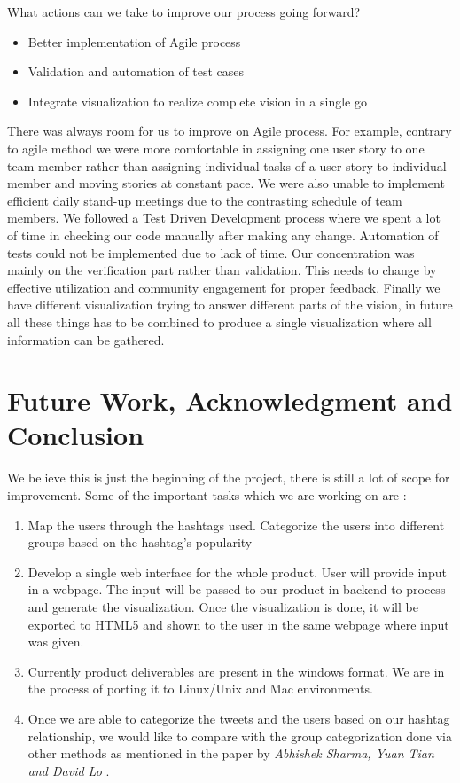 \documentclass[11pt]{article}
\begin{document}
What actions can we take to improve our process going forward? 
\begin{itemize}
\item Better implementation of Agile process 
\item Validation and automation of test cases
\item Integrate visualization to realize complete vision in a single go
\end{itemize}

There was always room for us to improve on Agile process. For example, contrary to agile method we were more comfortable in assigning one user story to one team member rather than assigning individual tasks of a user story to individual member and moving stories at constant pace. We were also unable to implement efficient daily stand-up meetings due to the contrasting schedule of team members. We followed a Test Driven Development process where we spent a lot of time in checking our code manually after making any change. Automation of tests could not be implemented due to lack of time. Our concentration was mainly on the verification part rather than validation. This needs to change by effective utilization and community engagement for proper feedback. Finally we have different visualization trying to answer different parts of the vision, in future all these things has to be combined to produce a single visualization where all information can be gathered. 

\section{Future Work, Acknowledgment and Conclusion}

We believe this is just the beginning of the project, there is still a lot of scope for improvement. Some of the important tasks which we are working on are :
\begin{enumerate}
\item Map the users through the hashtags used. Categorize the users into different groups based on the hashtag's popularity
\item Develop a single web interface for the whole product. User will provide input in a webpage. The input will be passed to our product in backend to process and generate the visualization. Once the visualization is done, it will be exported to HTML5 and shown to the user in the same webpage where input was given.
\item Currently product deliverables are present in the windows format. We are in the process of porting it to Linux/Unix and Mac environments.
\item Once we are able to categorize the tweets and the users based on our hashtag relationship, we would like to compare with the group categorization done via other methods as mentioned in the paper by \textit{Abhishek Sharma, Yuan Tian and David Lo}\cite{sehotintwitter} .
\end{enumerate}
\end{document}
